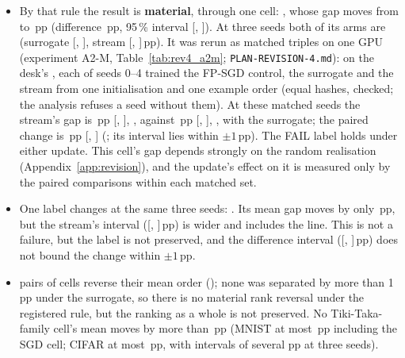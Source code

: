 \begin{itemize}
\item By that rule the result is \textbf{material}, through one cell: \RXFidMaterialList, whose gap moves from
      \RXFidMnistEcramMoKimTwoZeroOneNineSgdSur{} to \RXFidMnistEcramMoKimTwoZeroOneNineSgdSeq\,pp
      (difference \RXFidMnistEcramMoKimTwoZeroOneNineSgdD\,pp, 95\,\% interval [\RXFidMnistEcramMoKimTwoZeroOneNineSgdLo,
      \RXFidMnistEcramMoKimTwoZeroOneNineSgdHi]). At three seeds both of its arms are
      \RYFidMnistEcramMoKimTwoZeroOneNineSgdSurLabel{} (surrogate [\RYFidMnistEcramMoKimTwoZeroOneNineSgdSurLo,
      \RYFidMnistEcramMoKimTwoZeroOneNineSgdSurHi], stream [\RYFidMnistEcramMoKimTwoZeroOneNineSgdSeqLo,
      \RYFidMnistEcramMoKimTwoZeroOneNineSgdSeqHi]\,pp). It was rerun as matched triples on one GPU (experiment A2-M, Table~\ref{tab:rev4_a2m};
      \texttt{PLAN-REVISION-4.md}): on the desk's \RZAtwoMGpu, each of seeds 0--4 trained the FP-SGD control, the
      surrogate and the stream from one initialisation and one example order (equal hashes, checked; the analysis refuses
      a seed without them). At these \RZAtwoMN{} matched seeds the stream's gap is \RZAtwoMSeqGap\,pp [\RZAtwoMSeqLo,
      \RZAtwoMSeqHi], \RZAtwoMSeqLabel, against \RZAtwoMSurGap\,pp [\RZAtwoMSurLo, \RZAtwoMSurHi], \RZAtwoMSurLabel,
      with the surrogate; the paired change is \RZAtwoMD\,pp [\RZAtwoMDLo, \RZAtwoMDHi] (\RZAtwoMMaterial; its interval lies within $\pm1$\,pp). The FAIL label holds under either update.
      This cell's gap depends strongly on the random realisation (Appendix~\ref{app:revision}), and the update's effect on it is measured only by the paired comparisons within each matched set.
      
\item One label changes at the same three seeds: \RYFidTransList. Its mean gap moves by only
      \RXFidCifarEcramLiTangTwoZeroOneEightCttvTwoD\,pp, but the stream's interval
      ([\RYFidCifarEcramLiTangTwoZeroOneEightCttvTwoSeqLo, \RYFidCifarEcramLiTangTwoZeroOneEightCttvTwoSeqHi]\,pp) is wider and
      includes the line. This is not a failure, but the label is not preserved, and the difference interval
      ([\RXFidCifarEcramLiTangTwoZeroOneEightCttvTwoLo, \RXFidCifarEcramLiTangTwoZeroOneEightCttvTwoHi]\,pp) does not bound
      the change within $\pm1$\,pp.
\item \RYFidRevN{} pairs of cells reverse their mean order (\RYFidRevList); none was separated by more than 1\,pp under the
      surrogate, so there is no material rank reversal under the registered rule, but the ranking as a whole is not preserved.
      No Tiki-Taka-family cell's mean moves by more than \RXFidTtMaxAbs\,pp (MNIST at most \RXFidMnistMaxAbs\,pp including the
      SGD cell; CIFAR at most \RXFidCifarMaxAbs\,pp, with intervals of several pp at three seeds).
\end{itemize}
